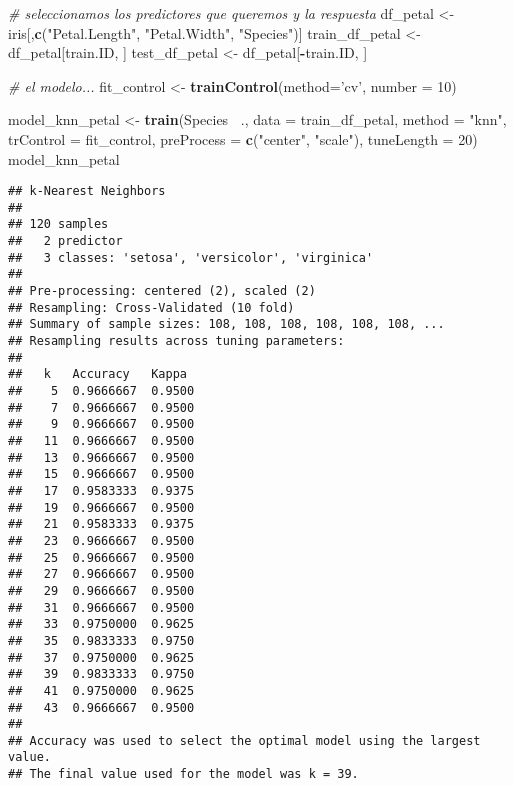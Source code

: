 \documentclass[]{book}
\newenvironment{Shaded}{\begin{snugshade}}{\end{snugshade}}
\newcommand{\CommentTok}[1]{\textcolor[rgb]{0.56,0.35,0.01}{\textit{#1}}}
\newcommand{\DataTypeTok}[1]{\textcolor[rgb]{0.13,0.29,0.53}{#1}}
\newcommand{\DecValTok}[1]{\textcolor[rgb]{0.00,0.00,0.81}{#1}}
\newcommand{\KeywordTok}[1]{\textcolor[rgb]{0.13,0.29,0.53}{\textbf{#1}}}
\newcommand{\NormalTok}[1]{#1}
\newcommand{\OperatorTok}[1]{\textcolor[rgb]{0.81,0.36,0.00}{\textbf{#1}}}
\newcommand{\StringTok}[1]{\textcolor[rgb]{0.31,0.60,0.02}{#1}}
\begin{document}
\begin{Shaded}
\begin{Highlighting}[]
\CommentTok{# seleccionamos los predictores que queremos y la respuesta}
\NormalTok{df_petal <-}\StringTok{ }\NormalTok{iris[,}\KeywordTok{c}\NormalTok{(}\StringTok{"Petal.Length"}\NormalTok{, }\StringTok{"Petal.Width"}\NormalTok{, }\StringTok{"Species"}\NormalTok{)]}
\NormalTok{train_df_petal <-}\StringTok{ }\NormalTok{df_petal[train.ID, ]}
\NormalTok{test_df_petal <-}\StringTok{ }\NormalTok{df_petal[}\OperatorTok{-}\NormalTok{train.ID, ]}

\CommentTok{# el modelo...}
\NormalTok{fit_control <-}\StringTok{ }\KeywordTok{trainControl}\NormalTok{(}\DataTypeTok{method=}\StringTok{'cv'}\NormalTok{, }\DataTypeTok{number =} \DecValTok{10}\NormalTok{)  }

\NormalTok{model_knn_petal <-}\StringTok{ }\KeywordTok{train}\NormalTok{(Species }\OperatorTok{~}\NormalTok{., }
                        \DataTypeTok{data =}\NormalTok{ train_df_petal, }
                        \DataTypeTok{method =} \StringTok{"knn"}\NormalTok{, }
                        \DataTypeTok{trControl =}\NormalTok{ fit_control, }
                        \DataTypeTok{preProcess =} \KeywordTok{c}\NormalTok{(}\StringTok{"center"}\NormalTok{, }\StringTok{"scale"}\NormalTok{),  }
                        \DataTypeTok{tuneLength =} \DecValTok{20}\NormalTok{)}
\NormalTok{model_knn_petal}
\end{Highlighting}
\end{Shaded}

\begin{verbatim}
## k-Nearest Neighbors 
## 
## 120 samples
##   2 predictor
##   3 classes: 'setosa', 'versicolor', 'virginica' 
## 
## Pre-processing: centered (2), scaled (2) 
## Resampling: Cross-Validated (10 fold) 
## Summary of sample sizes: 108, 108, 108, 108, 108, 108, ... 
## Resampling results across tuning parameters:
## 
##   k   Accuracy   Kappa 
##    5  0.9666667  0.9500
##    7  0.9666667  0.9500
##    9  0.9666667  0.9500
##   11  0.9666667  0.9500
##   13  0.9666667  0.9500
##   15  0.9666667  0.9500
##   17  0.9583333  0.9375
##   19  0.9666667  0.9500
##   21  0.9583333  0.9375
##   23  0.9666667  0.9500
##   25  0.9666667  0.9500
##   27  0.9666667  0.9500
##   29  0.9666667  0.9500
##   31  0.9666667  0.9500
##   33  0.9750000  0.9625
##   35  0.9833333  0.9750
##   37  0.9750000  0.9625
##   39  0.9833333  0.9750
##   41  0.9750000  0.9625
##   43  0.9666667  0.9500
## 
## Accuracy was used to select the optimal model using the largest value.
## The final value used for the model was k = 39.
\end{verbatim}
\end{document}
